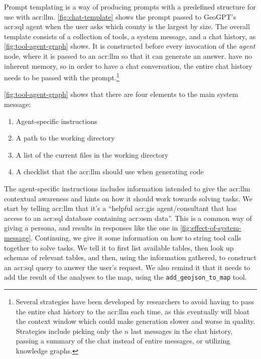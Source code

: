 Prompt templating is a way of producing prompts with a predefined structure for use with \acrshort{acr:llm}. \autoref{fig:chat-template} shows the prompt passed to GeoGPT's \acrshort{acr:sql} agent when the user asks which county is the largest by size. The overall template consists of a collection of tools, a system message, and a chat history, as \autoref{fig:tool-agent-graph} shows. It is constructed before every invocation of the \textit{agent} node, where it is passed to an \acrshort{acr:llm} so that it can generate an answer.  have no inherent memory, so in order to have a chat conversation, the entire chat history needs to be passed with the prompt.\footnote{Several strategies have been developed by researchers to avoid having to pass the entire chat history to the \acrshort{acr:llm} each time, as this eventually will bloat the context window which could make generation slower and worse in quality. Strategies include picking only the $n$ last messages in the chat history, passing a summary of the chat instead of entire messages, or utilizing knowledge graphs.}

\autoref{fig:tool-agent-graph} shows that there are four elements to the main system message:

\begin{enumerate}
    \item Agent-specific instructions
    \item A path to the working directory
    \item A list of the current files in the working directory
    \item A checklist that the \acrshort{acr:llm} should use when generating code
\end{enumerate}

The agent-specific instructions includes information intended to give the \acrshort{acr:llm} contextual awareness and hints on how it should work towards solving tasks. We start by telling \acrshort{acr:llm} that it's a \enquote{helpful \acrshort{acr:gis} agent/consultant that has access to an \acrshort{acr:sql} database containing \acrlong{acr:osm} data}. This is a common way of giving  a persona, and results in responses like the one in \autoref{fig:effect-of-system-message}. Continuing, we give it some information on how to string tool calls together to solve tasks. We tell it to first list available tables, then look up schemas of relevant tables, and then, using the information gathered, to construct an \acrshort{acr:sql} query to answer the user's request. We also remind it that it needs to add the result of the analyses to the map, using the \texttt{add\_geojson\_to\_map} tool.

